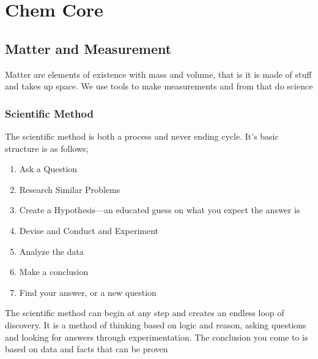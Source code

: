 \section{Chem Core}
    \subsection{Matter and Measurement}
    Matter are elements of existence with mass and volume, that is it is made of stuff and takes up space. We use tools to make measurements and from that do science
        \subsubsection{Scientific Method}
        The scientific method is both a process and never ending cycle. It's basic structure is as follows;
        \begin{enumerate}
            \item Ask a Question
            \item Research Similar Problems
            \item Create a Hypothesis—an educated guess on what you expect the answer is
            \item Devise and Conduct and Experiment
            \item Analyze the data
            \item Make a conclusion
            \item Find your answer, or a new question
        \end{enumerate}
        The scientific method can begin at any step and creates an endless loop of discovery. It is a method of thinking based on logic and reason, asking questions and looking for answers through experimentation. The conclusion you come to is based on data and facts that can be proven
